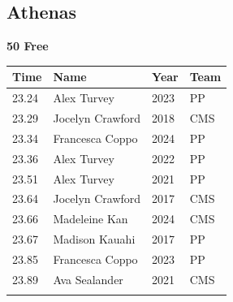 
\clearpage
{}

\clearpage
\subsection{Athenas}
\vspace{1.2em}
\noindent\begin{minipage}[t]{0.98\textwidth}
\centering
\textbf{\textcolor{teamprimary}{50 Free}}\par
\vspace{0.5em}
\centering
\small
\renewcommand{\arraystretch}{1.0}
\setlength{\tabcolsep}{4pt}
\begin{tabular}{@{}p{2.5cm}p{4.5cm}p{1.5cm}p{2.5cm}@{}}
\toprule
\textbf{Time} & \textbf{Name} & \textbf{Year} & \textbf{Team} \\
\midrule
23.24 & Alex Turvey & 2023 & PP \\
23.29 & Jocelyn Crawford & 2018 & CMS \\
23.34 & Francesca Coppo & 2024 & PP \\
23.36 & Alex Turvey & 2022 & PP \\
23.51 & Alex Turvey & 2021 & PP \\
23.64 & Jocelyn Crawford & 2017 & CMS \\
23.66 & Madeleine Kan & 2024 & CMS \\
23.67 & Madison Kauahi & 2017 & PP \\
23.85 & Francesca Coppo & 2023 & PP \\
23.89 & Ava Sealander & 2021 & CMS \\
\bottomrule
\vspace{0.5em}
\end{tabular}
\end{minipage}
\vspace{1.2em}
